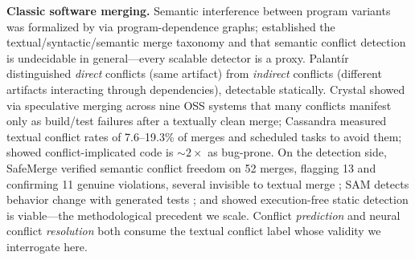 \documentclass{article}
\begin{document}
\textbf{Classic software merging.} Semantic interference between program variants was formalized by \citet{horwitz1989integrating} via program-dependence graphs; \citet{mens2002survey} established the textual/syntactic/semantic merge taxonomy and that semantic conflict detection is undecidable in general---every scalable detector is a proxy. Palant\'ir \citep{palantir} distinguished \emph{direct} conflicts (same artifact) from \emph{indirect} conflicts (different artifacts interacting through dependencies), detectable statically. Crystal \citep{crystal} showed via speculative merging across nine OSS systems that many conflicts manifest only as build/test failures after a textually clean merge; Cassandra \citep{cassandra} measured textual conflict rates of 7.6--19.3\% of merges and scheduled tasks to avoid them; %
\citet{brindescu2020merge} showed conflict-implicated code is ${\sim}2\times$ as bug-prone. On the detection side, SafeMerge verified semantic conflict freedom on 52 merges, flagging 13 and confirming 11 genuine violations, several invisible to textual merge \citep{safemerge}; %
SAM detects behavior change with generated tests \citep{sam2024}; and \citet{dejesus2023static} showed execution-free static detection is viable---the methodological precedent we scale. Conflict \emph{prediction} \citep{owhadi2019predicting} and neural conflict \emph{resolution} \citep{mergebert,deepmerge,mergebenchconf,conflictbench} both consume the textual conflict label whose validity we interrogate here.
\end{document}

